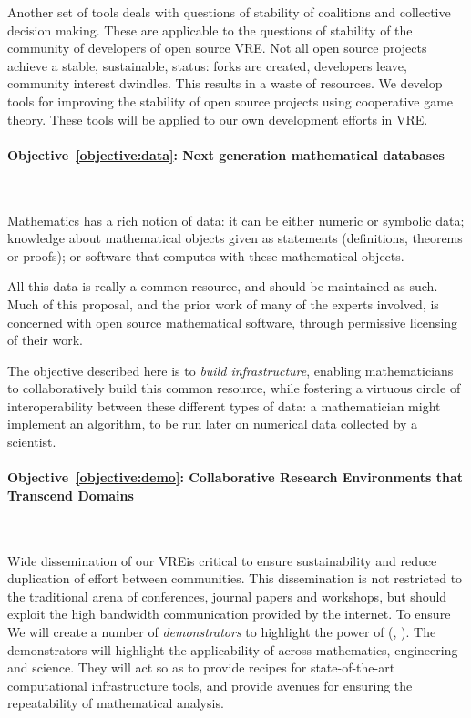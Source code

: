 \documentclass[noworkareas,deliverables,\classoptions]{euproposal}       %
\newcommand{\VREs}{VRE}
\begin{document}
\begin{proposal}
Another set of tools deals with questions of stability of coalitions
and collective decision making.  These are applicable to the questions
of stability of the community of developers of open source \VREs. Not
all open source projects achieve a stable, sustainable, status: forks
are created, developers leave, community interest dwindles. This
results in a waste of resources.  We develop tools for improving the
stability of open source projects using cooperative game theory. These
tools will be applied to our own development efforts in \TheProject
\VREs.


\paragraph{Objective~\ref{objective:data}: Next generation mathematical databases}\ 

Mathematics has a rich notion of data: it can be either
numeric or symbolic data; knowledge about mathematical objects given as
statements (definitions, theorems or proofs); or software that computes
with these mathematical objects.

All this data is really a common resource, and should be maintained as
such. Much of this proposal, and the prior work of many of the experts
involved, is concerned with open source mathematical software, through
permissive licensing of their work.

The objective described here is to \emph{build infrastructure},
enabling mathematicians to collaboratively build this common resource,
while fostering a virtuous circle of interoperability between these
different types of data: a mathematician might implement an
algorithm, to be run later on numerical data collected by a
scientist.

\paragraph{Objective~\ref{objective:demo}: Collaborative Research Environments that Transcend Domains}\ 

Wide dissemination of our \VREs is critical to ensure sustainability and reduce duplication of effort between communities. This dissemination is not restricted to the traditional arena of conferences, journal papers and workshops, but should exploit the high bandwidth communication provided by the internet. To ensure 
We will create a number of \emph{demonstrators} to highlight the power
of \TheProject{} (, ). The demonstrators will highlight the applicability
of \TheProject{} across mathematics, engineering and science. They
will act so as to provide recipes for state-of-the-art computational
infrastructure tools, and provide avenues for ensuring the
repeatability of mathematical analysis.


\end{proposal}
\end{document}

